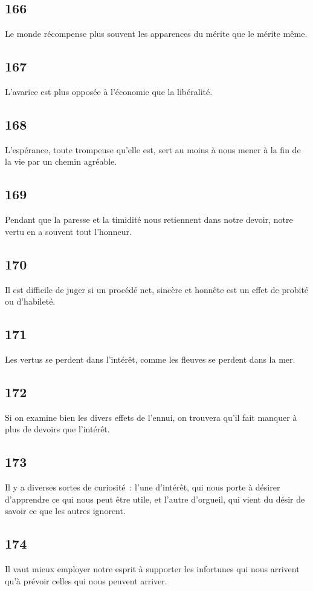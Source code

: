 \documentclass[french,twoside]{book} %
\begin{document}
\subsection[{166}]{ \textsc{166} }
\noindent Le monde récompense plus souvent les apparences du mérite que le mérite même.
\subsection[{167}]{ \textsc{167} }
\noindent L’avarice est plus opposée à l’économie que la libéralité.
\subsection[{168}]{ \textsc{168} }
\noindent L’espérance, toute trompeuse qu’elle est, sert au moins à nous mener à la fin de la vie par un chemin agréable.
\subsection[{169}]{ \textsc{169} }
\noindent Pendant que la paresse et la timidité nous retiennent dans notre devoir, notre vertu en a souvent tout l’honneur.
\subsection[{170}]{ \textsc{170} }
\noindent Il est difficile de juger si un procédé net, sincère et honnête est un effet de probité ou d’habileté.
\subsection[{171}]{ \textsc{171} }
\noindent Les vertus se perdent dans l’intérêt, comme les fleuves se perdent dans la mer.
\subsection[{172}]{ \textsc{172} }
\noindent Si on examine bien les divers effets de l’ennui, on trouvera qu’il fait manquer à plus de devoirs que l’intérêt.
\subsection[{173}]{ \textsc{173} }
\noindent Il y a diverses sortes de curiosité : l’une d’intérêt, qui nous porte à désirer d’apprendre ce qui nous peut être utile, et l’autre d’orgueil, qui vient du désir de savoir ce que les autres ignorent.
\subsection[{174}]{ \textsc{174} }
\noindent Il vaut mieux employer notre esprit à supporter les infortunes qui nous arrivent qu’à prévoir celles qui nous peuvent arriver.
\end{document}
